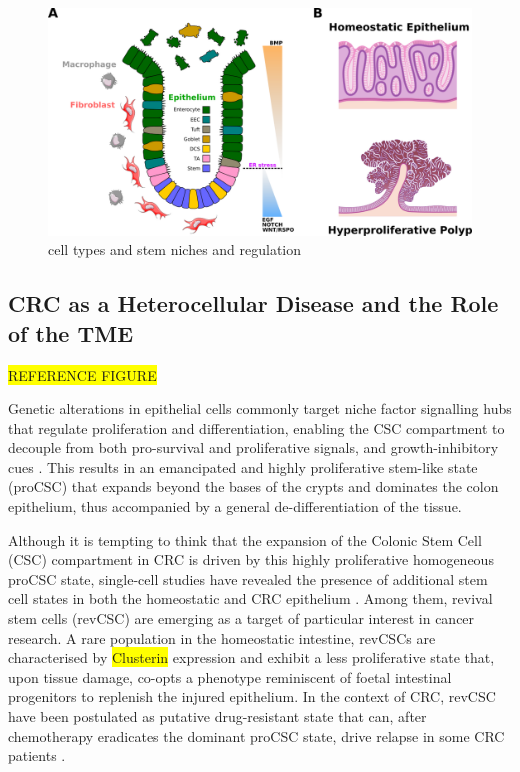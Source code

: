 \begin{figure}
    \centering
    \includegraphics{01intro/figs/1BIO_gutepithelia.png}
    \caption{cell types and stem niches and regulation}
    \label{fig:fig2}
\end{figure}

\subsection{CRC as a Heterocellular Disease and the Role of the TME}

\colorbox{yellow}{REFERENCE FIGURE }

Genetic alterations in epithelial cells commonly target niche factor signalling hubs that regulate proliferation and differentiation, enabling the CSC compartment to decouple from both pro-survival and proliferative signals, and growth-inhibitory cues \cite{sphyris_subversion_2021}. This results in an emancipated and highly proliferative stem-like state (proCSC) that expands beyond the bases of the crypts and dominates the colon epithelium, thus accompanied by a general de-differentiation of the tissue.

Although it is tempting to think that the expansion of the Colonic Stem Cell (CSC) compartment in CRC is driven by this highly proliferative homogeneous proCSC state, single-cell studies have revealed the presence of additional stem cell states in both the homeostatic and CRC epithelium \cite{norkin_single-cell_2020, bankaitis_reserve_2018,barriga_mex3a_2017,bues_deterministic_2022}.
Among them, revival stem cells (revCSC) are emerging as a target of particular interest in cancer research. A rare population in the homeostatic intestine, revCSCs are characterised by \colorbox{yellow}{Clusterin} expression and exhibit a less proliferative state that, upon tissue damage, co-opts a phenotype reminiscent of foetal intestinal progenitors to replenish the injured epithelium\cite{ayyaz_single-cell_2019}. In the context of CRC, revCSC have been postulated as putative drug-resistant state that can, after chemotherapy eradicates the dominant proCSC state, drive relapse in some CRC patients \cite{alvarez-varela_mex3a_2022}.

